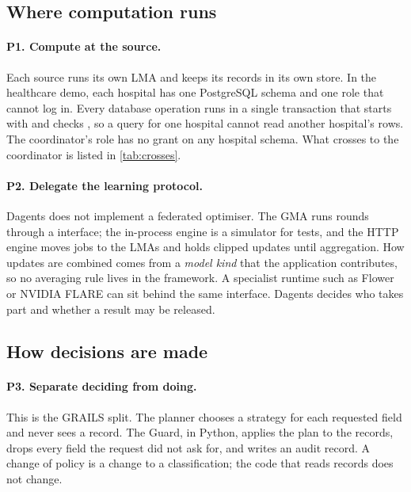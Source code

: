\subsection{Where computation runs}

\paragraph{P1. Compute at the source.} Each source runs its own LMA and keeps
its records in its own store. In the healthcare demo, each hospital has one
PostgreSQL schema and one role that cannot log in. Every database operation runs
in a single transaction that starts with  and checks
, so a query for one hospital cannot read another hospital's
rows. The coordinator's role has no grant on any hospital schema. What crosses
to the coordinator is listed in \cref{tab:crosses}.

\paragraph{P2. Delegate the learning protocol.} Dagents does not implement a
federated optimiser. The GMA runs rounds through a 
interface; the in-process engine is a simulator for tests, and the HTTP engine
moves jobs to the LMAs and holds clipped updates until aggregation. How updates
are combined comes from a \emph{model kind} that the application contributes,
so no averaging rule lives in the framework. A specialist runtime such as
Flower or NVIDIA FLARE can sit behind the same interface. Dagents decides who
takes part and whether a result may be released.

\subsection{How decisions are made}

\paragraph{P3. Separate deciding from doing.} This is the GRAILS split. The
planner chooses a strategy for each requested field and never sees a record.
The Guard, in Python, applies the plan to the records, drops every field the
request did not ask for, and writes an audit record. A change of policy is a
change to a classification; the code that reads records does not change.

